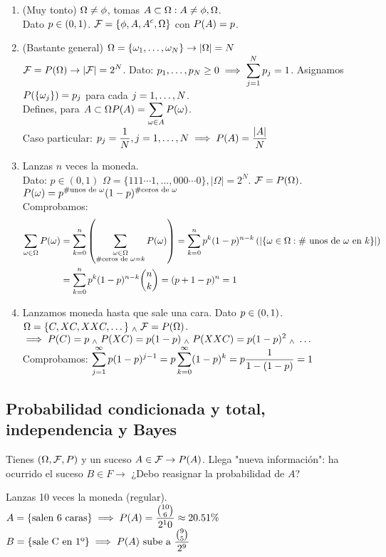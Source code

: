 \begin{enumerate}%
	\item (Muy tonto) $\displaystyle\Omega \ne \phi$, tomas $\displaystyle A \subset \Omega : A\ne \phi, \Omega$. \\
	Dato $\displaystyle p\in (0, 1)$. $\displaystyle\mathcal{F} = \{\phi, A, A^c, \Omega\}$ con $\displaystyle P(A) = p$.
	\item (Bastante general) $\displaystyle\Omega = \{\omega_1, \dots, \omega_N\} \rightarrow |\Omega| = N$ \\
	$\displaystyle\mathcal{F} = P(\Omega) \rightarrow |\mathcal{F}|=2^N$. Dato: $\displaystyle p_1, \dots, p_N \ge 0 \implies \sum_{j=1}^N p_j=1$.
	Asignamos $\displaystyle P(\{\omega_j\})=p_j$ para cada $\displaystyle j=1, \dots, N$.\\
	Defines, para $\displaystyle A\subset \Omega P(A) = \sum_{\omega \in A}P(\omega)$.\\
	Caso particular: $\displaystyle p_j=\frac{1}{N}, j = 1,\dots, N \implies P(A)=\frac{|A|}{N}$
	\item Lanzas $n$ veces la moneda. \\
	Dato: $p \in (0,1)$
	$\Omega = \{111\cdots1, \dots, 000\cdots0\}, |\Omega|=2^N$. $\mathcal{F}=P(\Omega)$. \\
	$\displaystyle P(\omega)= p^{\#\text{unos de }\omega} (1-p)^{\#\text{ceros de }\omega}$ \\
	Comprobamos:
	\begin{equation*}
		\begin{split}
			\displaystyle\sum_{\omega \in \Omega} P(\omega)&=\sum_{k=0}^n \left(\sum_{\substack{\omega\in \Omega \\
			\#\text{ceros de }\omega = k}} P(\omega)\right)=\sum_{k=0}^n p^k (1-p)^{n-k}\left(|\{\omega\in \Omega :\#\text{ unos de } \omega\text{ en }k\}|\right) \\
			&=\sum_{k=0}^np^k(1-p)^{n-k} \binom{n}{k} = (p+1-p)^n=1
		\end{split}
	\end{equation*}
	\item Lanzamos moneda hasta que sale una cara. Dato $\displaystyle p\in (0,1)$. \\
	$\displaystyle \Omega = \{C, XC, XXC, \dots\} \; _{\wedge} \; \mathcal{F}=P(\Omega)$. \\
	$\displaystyle \implies P(C)=p \; _{\wedge} \; P(XC)=p(1-p) \; _{\wedge} \; P(XXC)=p(1-p)^2 \; _{\wedge} \; \dots$ \\
	Comprobamos: $\displaystyle\sum_{j=1}^{\infty} p(1-p)^{j-1} = p\sum_{k=0}^\infty(1-p)^k = p \frac{1}{1-(1-p)} = 1$
\end{enumerate}

\subsection{Probabilidad condicionada y total, independencia y Bayes}
Tienes $(\Omega, \mathcal{F}, P)$ y un suceso $A\in \mathcal{F} \rightarrow P(A)$. Llega "nueva información": ha ocurrido el suceso $B\in F \rightarrow$ ¿Debo reasignar la probabilidad de $A$?
\begin{ejem}
	Lanzas 10 veces la moneda (regular). \\
	$\displaystyle A=\{\text{salen 6 caras}\} \implies P(A)=\frac{\binom{10}{6}}{2^10} \approx 20.51 \%$
	$\displaystyle B=\{\text{sale C en 1º}\} \implies P(A)\text{ sube a }\frac{\binom{9}{5}}{2^9}$
\end{ejem}

